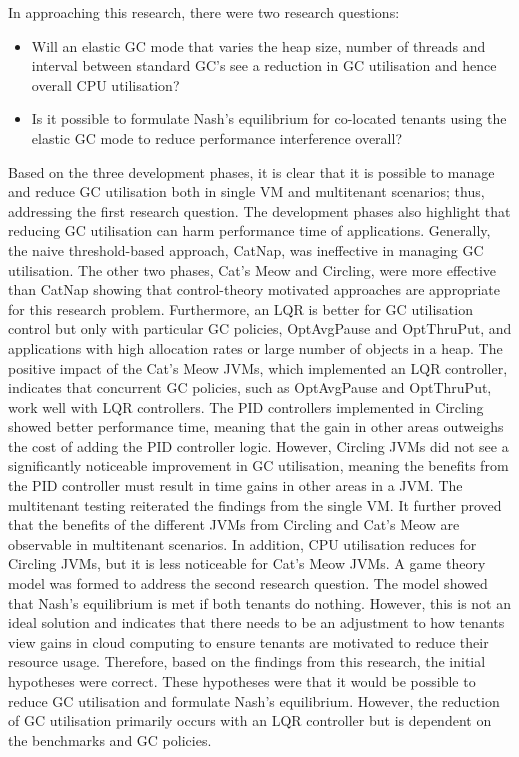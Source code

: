 
In approaching this research, there were two research questions:
\begin{itemize}
\item

  Will an elastic GC mode that varies the heap size, number of threads
  and interval between standard GC's see a reduction in GC utilisation
  and hence overall CPU utilisation?
  
\item

  Is it possible to formulate Nash's equilibrium for co-located tenants
  using the elastic GC mode to reduce performance interference overall?
  
\end{itemize}
Based on the three development phases, it is clear that it is possible
to manage and reduce GC utilisation both in single VM and multitenant
scenarios; thus, addressing the first research question. The development
phases also highlight that reducing GC utilisation can harm performance
time of applications. Generally, the naive threshold-based approach,
CatNap, was ineffective in managing GC utilisation. The other two
phases, Cat's Meow and Circling, were more effective than CatNap showing
that control-theory motivated approaches are appropriate for this
research problem. Furthermore, an LQR is better for GC utilisation
control but only with particular GC policies, OptAvgPause and
OptThruPut, and applications with high allocation rates or large number of
objects in a heap. The positive impact of the Cat's Meow JVMs, which
implemented an LQR controller, indicates that concurrent GC policies,
such as OptAvgPause and OptThruPut, work well with LQR controllers. The
PID controllers implemented in Circling showed better performance time,
meaning that the gain in other areas outweighs the cost of adding the
PID controller logic. However, Circling JVMs did not see a significantly
noticeable improvement in GC utilisation, meaning the benefits from the
PID controller must result in time gains in other areas in a JVM.
\newline\newline
The multitenant testing reiterated the findings from the single VM. It
further proved that the benefits of the different JVMs from Circling and
Cat's Meow are observable in multitenant scenarios. In addition, CPU
utilisation reduces for Circling JVMs, but it is less noticeable for
Cat's Meow JVMs.
\newline\newline
A game theory model was formed to address the second research question.
The model showed that Nash's equilibrium is met if both tenants do
nothing. However, this is not an ideal solution and indicates that there
needs to be an adjustment to how tenants view gains in cloud computing
to ensure tenants are motivated to reduce their resource usage.
\newline\newline
Therefore, based on the findings from this research, the initial
hypotheses were correct. These hypotheses were that it would be possible
to reduce GC utilisation and formulate Nash's equilibrium. However, the
reduction of GC utilisation primarily occurs with an LQR controller but
is dependent on the benchmarks and GC policies.

